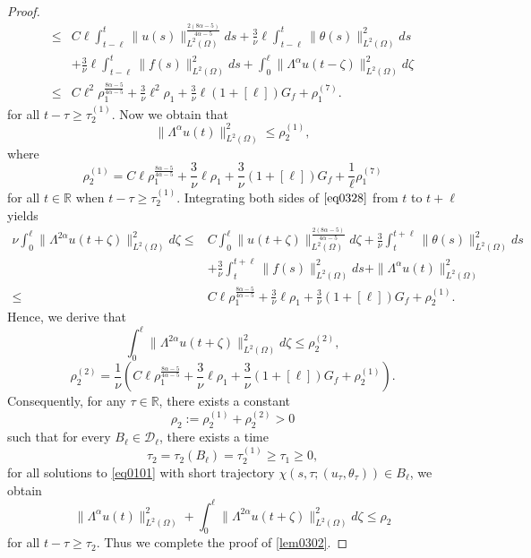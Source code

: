 \documentclass[oneside,preprint,12pt,numbers,sort&compress]{elsarticle}
\begin{document}
\begin{proof}
\begin{equation}
\begin{aligned}
  \leq & C \ell \int_{t-\ell}^{t}
  \|u(s)\|_{L^2(\Omega)}^{\frac{2(8\alpha-5)}{4\alpha-5}}
   ds 
  +\frac{3}{\nu}\ell \int_{t-\ell}^{t}
  \|\theta(s)\|_{L^2(\Omega)}^{2} ds 
  \\
  &+\frac{3}{\nu} \ell \int_{t-\ell}^{t}
  \|f(s)\|_{L^2(\Omega)}^{2} ds
  +\int_{0}^{\ell} \|\Lambda^{\alpha}  u(t-\zeta)\|_{L^2(\Omega)}^{2} d\zeta
  \\
  \leq & C \ell^{2}
  \rho_{1}^{\frac{8\alpha-5}{4\alpha-5}}
  +\frac{3}{\nu} \ell^2 \rho_{1}
  +\frac{3}{\nu} \ell (1+[\ell]) G_{f}
  +\rho_{1}^{(7)}.
\end{aligned}
\end{equation}
for all $t-\tau \geq \tau_{2}^{(1)}$. Now we obtain that
\begin{equation}\label{eq0330}
\| \Lambda^{\alpha} u(t)\|_{L^2(\Omega)}^{2}
  \leq  \rho_{2}^{(1)},
\end{equation}
where
\begin{equation}
    \rho_{2}^{(1)}= C \ell
  \rho_{1}^{\frac{8\alpha-5}{4\alpha-5}}
  +\frac{3}{\nu} \ell \rho_{1}
  +\frac{3}{\nu}  (1+[\ell]) G_{f}
  +\frac{1}{\ell}\rho_{1}^{(7)}
\end{equation}
for all $t \in \mathbb{R}$ when $t - \tau \geq \tau_{2}^{(1)}$.
Integrating both sides of $\eqref{eq0328}$ from $t$ to $t+\ell$ yields
\begin{equation}
\begin{aligned}
  \nu \int_{0}^{\ell} \| \Lambda^{2\alpha} u(t+\zeta) \|_{L^2(\Omega)}^{2} d\zeta 
  \leq & C\int_{0}^{\ell}\|u(t+\zeta)\|_{L^2(\Omega)}^{\frac{2(8\alpha-5)}{4\alpha-5}}
    d\zeta
  +\frac{3}{\nu}\int_{t}^{t+\ell} \|\theta(s)\|_{L^2(\Omega)}^{2} ds \\
  &+\frac{3}{\nu}\int_{t}^{t+\ell} \|f(s)\|_{L^2(\Omega)}^{2} ds +\|\Lambda^{\alpha} u(t)\|_{L^2(\Omega)}^{2}\\
  \leq & 
   C\ell \rho_{1}^{\frac{8\alpha-5}{4\alpha-5}}
  +\frac{3}{\nu} \ell \rho_{1}
  +\frac{3}{\nu}(1+[\ell]) G_{f}
  +\rho_{2}^{(1)}.
\end{aligned}
\end{equation}
Hence, we derive that
\begin{equation}
\int_{0}^{\ell} \| \Lambda^{2\alpha} u(t+\zeta) \|_{L^2(\Omega)}^{2} d\zeta 
  \leq \rho_{2}^{(2)},
\end{equation}
$$
\rho_{2}^{(2)}=\frac{1}{\nu}\left(C \ell \rho_{1}^{\frac{8\alpha-5}{4\alpha-5}}
  +\frac{3}{\nu} \ell \rho_{1}
  +\frac{3}{\nu}(1+[\ell]) G_{f}
  +\rho_{2}^{(1)}\right).
$$
Consequently, for any $\tau \in \mathbb{R}$, there exists a constant 
$$
\rho_2:=\rho_{2}^{(1)}+\rho_{2}^{(2)}>0
$$
such that for every $B_{\ell} \in \mathcal{D}_{\ell}$, there exists a time 
$$
\tau_2 =\tau_2(B_{\ell})=\tau_{2}^{(1)} \geq \tau_{1}\geq 0 ,
$$
for all solutions to \cref{eq0101} with short trajectory $\chi(s,\tau; (u_\tau, \theta_\tau)) \in B_{\ell}$, we obtain
\[
\| \Lambda^{\alpha} u(t)\|_{L^2(\Omega)}^{2}
+ \int_{0}^{\ell} \| \Lambda^{2\alpha} u(t+\zeta) \|_{L^2(\Omega)}^{2} d\zeta 
\leq \rho_2 
\]
for all $t-\tau \geq \tau_2$. Thus we complete the proof of \cref{lem0302}.
\end{proof}
 
\end{document}
